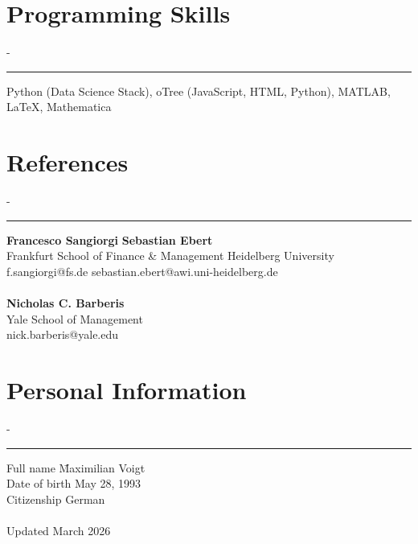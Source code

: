 \documentclass{res}
\newcommand{\sectionline}{	\vspace{-8pt}
	{\parindent-\sectionwidth \rule{\resumewidth}{0.4pt}} }
\newenvironment{nstabbing}
  {\setlength{\topsep}{-\parskip}%
   \setlength{\partopsep}{0pt}%
   \tabbing}
  {\endtabbing}
\begin{document}
\begin{resume}
\section{Programming Skills}
	\sectionline
	\vspace{-3ex}
	\begin{nstabbing}
	Python (Data Science Stack), oTree (JavaScript, HTML, Python), MATLAB, \LaTeX, Mathematica
	\end{nstabbing}

\section{References}
	\sectionline
	\vspace{-3ex}
	\begin{nstabbing}
		\textbf{Francesco Sangiorgi} \hspace{12em} \= \textbf{Sebastian Ebert} \\
		Frankfurt School of Finance \& Management \> Heidelberg University \\
		f.sangiorgi@fs.de \> sebastian.ebert@awi.uni-heidelberg.de  \\
		\\
		\textbf{Nicholas C. Barberis}  \\
		Yale School of Management  \\
		nick.barberis@yale.edu
	\end{nstabbing}

\section{Personal Information}
	\sectionline
	\vspace{-3ex}
	\begin{nstabbing}
		Full name \qquad \= Maximilian Voigt \\
		Date of birth  \> May 28, 1993 \\
		Citizenship  \> German \\
		\\
		Updated \> March 2026
	\end{nstabbing} 

\end{resume}
\end{document}
